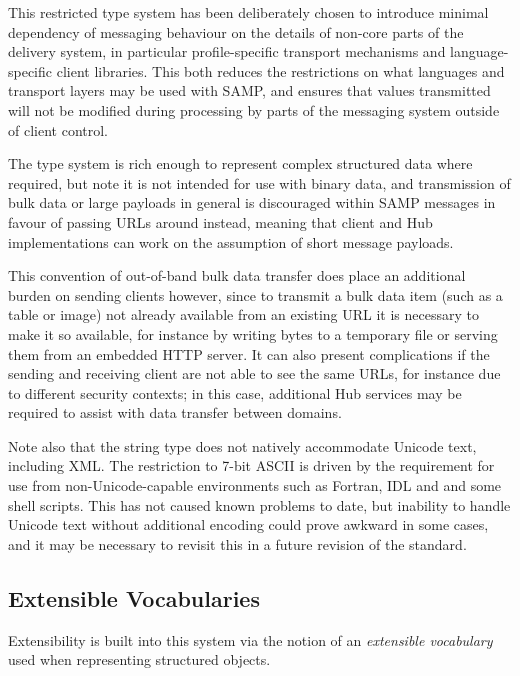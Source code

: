 \documentclass[5p]{elsarticle}
\begin{document}
This restricted type system has been deliberately chosen to introduce
minimal dependency of messaging behaviour on the details of
non-core parts of the delivery system,
in particular profile-specific transport mechanisms and language-specific
client libraries.
This both reduces the restrictions on what languages and transport layers
may be used with SAMP, and ensures that values transmitted will
not be modified during processing by parts of the messaging system
outside of client control.


The type system is rich enough to represent complex structured data
where required, but note it is not intended for use with
binary data, and transmission of bulk data or large payloads
in general is discouraged within SAMP messages in favour of
passing URLs around instead, meaning that
client and Hub implementations can work on the assumption
of short message payloads.

This convention of out-of-band bulk data transfer does place
an additional burden on sending clients however,
since to transmit a bulk data item (such as a table or image)
not already available from an existing URL
it is necessary to make it so available, for instance by writing
bytes to a temporary file or serving them from an embedded HTTP server.
It can also present complications if the sending and receiving client
are not able to see the same URLs, for instance due to different security
contexts; in this case, additional Hub services may be required to
assist with data transfer between domains.

Note also that the string type does not natively accommodate Unicode text,
including XML.
The restriction to 7-bit ASCII is driven by the requirement for use
from non-Unicode-capable environments such as Fortran, IDL and
and some shell scripts.
This has not caused known problems to date, but inability to handle
Unicode text without additional encoding could prove awkward in
some cases, and it may be necessary to revisit this in a future
revision of the standard.

\subsection{Extensible Vocabularies} \label{sec:extVocabs}

Extensibility is built into this system via the notion of an
{\em extensible vocabulary} used when representing structured objects.
\end{document}
